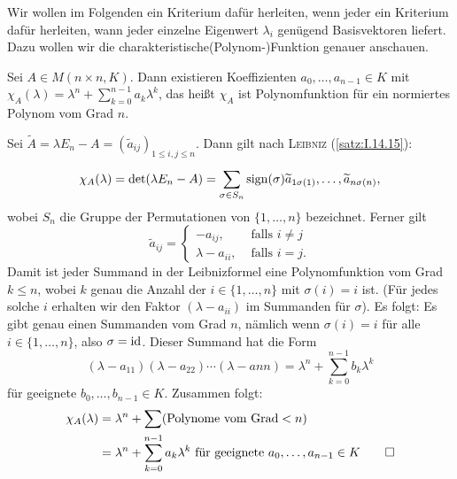 Wir wollen im Folgenden ein Kriterium dafür herleiten, wenn jeder ein Kriterium dafür herleiten, wann jeder einzelne Eigenwert $\lambda_i$ genügend Basisvektoren liefert.
Dazu wollen wir die charakteristische\linebreak (Polynom-)Funktion genauer anschauen.

\begin{satz}
	\label{satz:2.1}
	Sei $A \in M(n \times n,K)$.
	Dann existieren Koeffizienten $a_0, \dots,a_{n-1} \in K$ mit $\chi_A(\lambda) = \lambda^n + \sum_{k=0}^{n-1} a_k \lambda^k$, das heißt $\chi_A$ ist Polynomfunktion für ein normiertes Polynom vom Grad $n$.
\end{satz}

\begin{beweis}
	Sei $\widetilde{A}	 = \lambda E_n - A = (\widetilde{a}_{ij})_{1 \leq i,j \leq n}$.
	Dann gilt nach \textsc{Leibniz} (\autoref{satz:I.14.15}):
	\[
		\chi_A(\lambda) = \det(\lambda E_n - A) = \sum_{\sigma \in S_n}^{} \operatorname{sign}(\sigma) \widetilde{a}_{1 \sigma(1)},\dots,\widetilde{a}_{n \sigma (n)},
	\]
	wobei $S_n$ die Gruppe der Permutationen von $\{1,\dots,n\}$ bezeichnet.
	Ferner gilt
	\[
		\widetilde{a}_{ij} = \begin{cases}
			-a_{ij}, & \text{ falls } i \neq j \\
			\lambda - a_{ii}, & \text{ falls } i = j.
		\end{cases}
	\]
	Damit ist jeder Summand in der Leibnizformel eine Polynomfunktion vom Grad $k \leq n$, wobei $k$ genau die Anzahl der $i \in \{1,\dots,n\}$ mit $\sigma(i) = i$ ist.
	(Für jedes solche $i$ erhalten wir den Faktor $(\lambda - a_{ii})$ im Summanden für $\sigma$).
	\newpage	
	Es folgt: Es gibt genau einen Summanden vom Grad $n$, nämlich wenn $\sigma(i) = i$ für alle $i \in \{1,\dots,n\}$, also $\sigma=\operatorname{id}$.
	Dieser Summand hat die Form
	\[
		(\lambda - a_{11})(\lambda-a_{22}) \cdots (\lambda-a{nn}) = \lambda^n + \sum_{k=0}^{n-1} b_k \lambda^k
	\]
	für geeignete $b_0,\dots,b_{n-1} \in K$.
	Zusammen folgt:
	\begin{align*}
		\chi_A(\lambda) &= \lambda^n + \sum (\text{Polynome vom Grad} < n) \\
		&= \lambda^n + \sum_{k=0}^{n-1} a_k \lambda^k \text{ für geeignete } a_0,\dots,a_{n-1} \in K \qedhere
	\end{align*}
\end{beweis}

